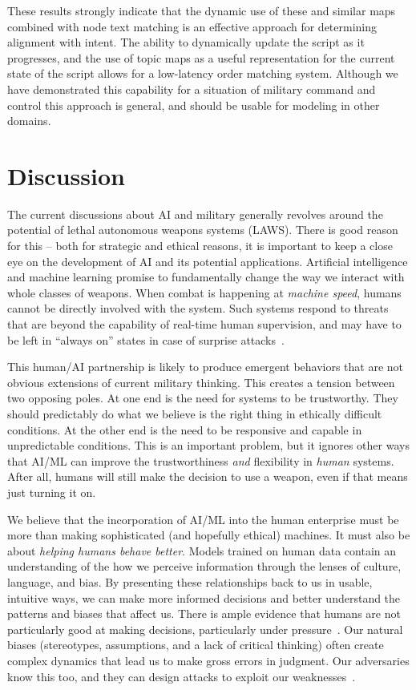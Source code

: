 \documentclass[11pt,dvipdfm]{article}
\begin{document}
These results strongly indicate that the dynamic use of these and similar maps combined with node text matching is an effective approach for determining alignment with intent. The ability to dynamically update the script as it progresses, and the use of topic maps as a useful representation for the current state of the script allows for a low-latency order matching system. Although we have demonstrated this capability for a situation of military command and control this approach is general, and should be usable for modeling in other domains.


\section{Discussion}
\label{sec:discussion}
The current discussions about AI and military generally revolves around the potential of lethal autonomous weapons systems (LAWS). There is good reason for this -- both for strategic and ethical reasons, it is important to keep a close eye on the development of AI and its potential applications. Artificial intelligence and machine learning promise to fundamentally change the way we interact with whole classes of weapons. When combat is happening at \textit{machine speed}, humans cannot be directly involved with the system.  Such  systems respond to threats that are beyond the capability of real-time human supervision, and may have to be left in \enquote{always on} states in case of surprise attacks~\cite{feldman2019integrating}.  

This human/AI partnership is likely to produce emergent behaviors that are not obvious extensions of current military thinking.  This creates a tension between two opposing poles.  At one end is the need for systems to be trustworthy. They should predictably do what we believe is the right thing in ethically difficult conditions.  At the other end is the need to be responsive and capable in unpredictable conditions. This is an important problem, but it ignores other ways that AI/ML can improve the trustworthiness \textit{and} flexibility in \textit{human} systems. After all, humans will still make the decision to use a weapon, even if that means just turning it on.

We believe that the incorporation of AI/ML into the human enterprise must be more than making sophisticated (and hopefully ethical) machines. It must also be about \textit{helping humans behave better}. Models trained on human data contain an understanding of the how we perceive information through the lenses of culture, language, and bias. By presenting these relationships back to us in usable, intuitive ways, we can make more informed decisions and better understand the patterns and biases that affect us. There is ample evidence that humans are not particularly good at making decisions, particularly under pressure~\cite{feldman2019integrating}.  Our natural biases (stereotypes, assumptions, and a lack of critical thinking) often create complex dynamics that lead us to make gross errors in judgment. Our adversaries know this too, and they can design attacks to exploit our weaknesses~\cite{feldman2018one}.
\end{document}
